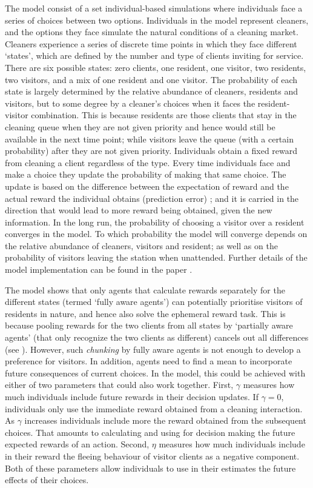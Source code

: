 \documentclass[]{rsos}%
\begin{document}
The model consist of a set individual-based simulations where
individuals face a series of choices between two options. Individuals in
the model represent cleaners, and the options they face simulate the
natural conditions of a cleaning market. Cleaners experience a series
of discrete time points in which they face different `states', which
are defined by the number and type of clients inviting for service.
There are six possible states: zero clients, one resident, one visitor,
two residents, two visitors, and a mix of one resident and one visitor.
The probability of each state is largely determined by the relative
abundance of cleaners, residents and visitors, but to some degree by a
cleaner's choices when it faces the resident-visitor combination.
This is because residents are those clients that stay in the
cleaning queue when they are not given priority and hence would
still be available in the next time point; while visitors leave
the queue (with a certain probability) after they are not given
priority. Individuals obtain a fixed reward from cleaning a client
regardless of the type. Every time individuals face and make a choice
they update the probability of making that same choice. The update is
based on the difference between the expectation of reward and the actual
reward the individual obtains (prediction error)
\citep{sutton_Reinforcement_2018, rescorla_Theory_1972}; and it is carried
in the direction that would lead to more reward being obtained, given
the new information. In the long run, the probability of choosing a visitor
over a resident converges in the model. To which probability the model
will converge depends on the relative abundance of cleaners, visitors
and resident; as well as on the probability of visitors leaving the station
when unattended. Further details of the model implementation can be
found in the paper \citep{quinones_Reinforcement_2019}.

The model shows that only agents that calculate rewards separately for
the different states (termed `fully aware agents') can potentially
prioritise visitors of residents in nature, and hence also solve the
ephemeral reward task. This is because pooling rewards for the two
clients from all states by `partially aware agents'
(that only recognize the two clients as different) cancels out
all differences (see \citep{quinones_Reinforcement_2019}). However,
such \emph{chunking} by fully aware agents is not enough to develop a
preference for visitors. In addition, agents need to find a mean
to incorporate future consequences of current choices. In the model,
this could be achieved with either of two parameters that could
also work together. First, \(\gamma\) measures how
much individuals include future rewards in their decision updates. If
\(\gamma=0\), individuals only use the immediate reward obtained from a
cleaning interaction. As \(\gamma\) increases individuals include more the
reward obtained from the subsequent choices. That amounts to calculating
and using for decision making the future expected rewards of an action.
Second, \(\eta\) measures how much individuals include in their reward the
fleeing behaviour of visitor clients as a negative component. Both of
these parameters allow individuals to use in their estimates the future
effects of their choices.
\end{document}

